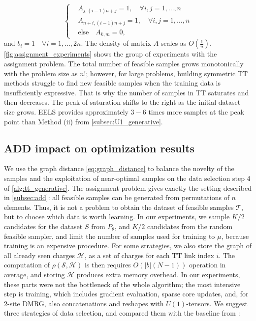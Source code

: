 \documentclass{article}
\theoremstyle{plain}
\theoremstyle{definition}
\theoremstyle{remark}
\begin{document}
\begin{equation}
\left\{
\begin{aligned}
    & A_{j, (i-1)n+j} = 1, \quad \forall i,j = 1, \dots, n\\[4pt]
    & A_{n+i, (i-1)n+j} = 1, \quad \forall i,j = 1, \dots, n\\[4pt]
    & \text{else} \quad A_{k, m} = 0,
\end{aligned}
\right.
\label{eq:assignment_matrix}
\end{equation}
and $b_i=1 \quad \forall i = 1, \dots ,2n$. The density of matrix $A$ scales as $O(\frac{1}{n})$. \cref{fig:assignment_experiments} shows the group of experiments with the assignment problem. 
The total number of feasible samples grows monotonically with the problem size as $n!$; however, for large problems, building symmetric  TT methods struggle to find new feasible samples when the training data is insufficiently expressive. That is why the number of samples in TT saturates and then decreases. The peak of saturation shifts to the right as the initial dataset size grows. EELS provides approximately $3-6$ times more samples at the peak point than Method (ii) from \cref{subsec:U1_generative}.

\subsection {ADD impact on optimization results}
\label{subsec:diversify_data_res}

We use the graph distance \cref{eq:graph_distance} to balance the novelty of the samples and the exploitation of near-optimal samples on the data selection step 4 of \cref{alg:tt_generative}. The assignment problem gives exactly the setting described in \cref{subsec:add}: all feasible samples can be generated from permutations of $n$ elements. Thus, it is not a problem to obtain the dataset of feasible samples $\mathcal{T}$, but to choose which data is worth learning. In our experiments, we sample $K/2$ candidates for the dataset $S$ from $P_{\theta}$, and $K/2$ candidates from the random feasible sampler, and limit the number of samples used for training to $\mu$, because training is an expensive procedure. For some strategies, we also store the graph of all already seen charges $\mathcal{H}$, as a set of charges for each TT link index $i$. The computation of $\rho(\mathcal{S}, \mathcal{H})$ is then requires $O(|b|(N-1))$ operation in average, and storing $\mathcal{H}$ produces extra memory overhead. In our experiments, these parts were not the bottleneck of the whole algorithm; the most intensive step is training, which includes gradient evaluation, sparse core updates, and, for 2-site DMRG, also concatenations and reshapes with $U(1)$-tensors.
We suggest three strategies of data selection, and compared them with the baseline from \cite{LopezPiqueres2023}:
\end{document}
